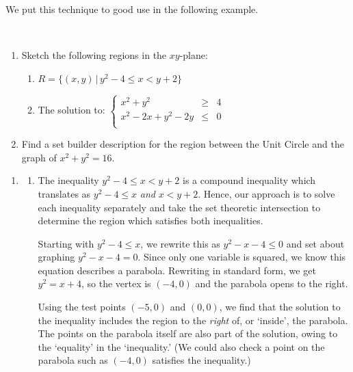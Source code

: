 \documentclass{ximera}
\begin{document}
We put this technique to good use in the following example.

\begin{example} \label{nonlinearineqex}   $~$  

\begin{enumerate}

\item  Sketch the following regions in the $xy$-plane:

\begin{enumerate}

\item $R = \{ (x,y) \, | \, y^2 - 4 \leq x < y+2 \}$

\item  The solution to: $\left\{\begin{array}{rcr}  x^2 +y^2 & \geq & 4 \\ x^2 - 2x + y^2 - 2y & \leq & 0 \\ \end{array} \right.$

\end{enumerate}

\item  Find a set builder description for the region between the Unit Circle and the graph of  $x^2+y^2 = 16$.

\end{enumerate}

\begin{explanation} 

\begin{enumerate}

\item \begin{enumerate}

\item  The inequality $y^2 - 4 \leq x < y+2$ is a compound inequality which translates as $y^2 - 4 \leq x$ \textit{and} $x < y+2$. Hence, our approach is to solve each inequality separately and take the set theoretic intersection to determine the region which satisfies both inequalities.  

Starting with $y^2 - 4 \leq x$, we rewrite this as $y^2 - x - 4 \leq 0$ and set about graphing $y^2 - x - 4 = 0$.  Since only one variable is squared, we know this equation describes a parabola.   Rewriting in  standard form, we get $y^2 = x+4$, so the vertex is $(-4,0)$ and the parabola opens to the right.  

Using the test points $(-5,0)$ and $(0,0)$, we find that the solution to the inequality includes the region to the \textit{right} of, or `inside', the parabola.  The points on the parabola itself are also part of the solution, owing to the `equality' in the `inequality.'  (We could also check a point on the parabola such as $(-4,0)$ satisfies the inequality.) 


\end{enumerate}
\end{enumerate}
\end{explanation}
\end{example}
\end{document}
